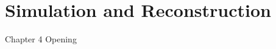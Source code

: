 \chapter{Simulation and Reconstruction}

\ifpdf
    \graphicspath{{Chapter4/Figs/Raster/}{Chapter4/Figs/PDF/}{Chapter4/Figs/}}
\else
    \graphicspath{{Chapter4/Figs/Vector/}{Chapter4/Figs/}}
\fi


Chapter 4 Opening

\newpage

